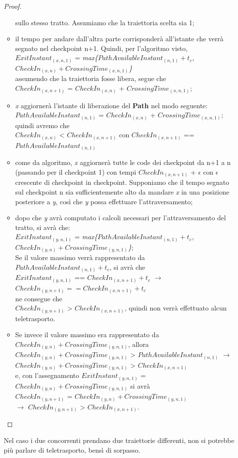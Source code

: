 \begin{itemize}
\begin{proof}
\begin{itemize}
sullo stesso tratto. Assumiamo che la traiettoria scelta sia 1;
\item il tempo per andare dall'altra parte corrisponderà all'istante che verrà segnato nel checkpoint 
n+1. Quindi, per l'algoritmo visto, \\
$ExitInstant_{(x,n,1)}$ = \emph{max\{$PathAvailableInstant_{(n,1)}+t_c$,$CheckIn_{(x,n)}+CrossingTime_{(x,n,1)}$\}}\\
assumendo che la traiettoria fosse libera, segue che\\
$CheckIn_{(x,n+1)}$ = $CheckIn_{(x,n)}$ + $CrossingTime_{(x,n,1)}$;
\item \emph{x} aggiornerà l'istante di liberazione del \textbf{Path} nel modo seguente:
$PathAvailableInstant_{(n,1)}$ = $CheckIn_{(x,n)}$ + $CrossingTime_{(x,n,1)}$;\\
quindi avremo che\\
$CheckIn_{(x,n)}$ < $CheckIn_{(x,n+1)}$ con $CheckIn_{(x,n+1)}$ == $PathAvailableInstant_{(n,1)}$
\item come da algoritmo, \emph{x} aggiornerà tutte le code dei checkpoint da n+1 a n (passando per il checkpoint 1) con tempi $CheckIn_{(x,n+1)}$ + $\epsilon$ 
con $\epsilon$ crescente di checkpoint in checkpoint. Supponiamo che il tempo segnato sul checkpoint n sia sufficientemente alto da mandare \emph{x}
in una posizione posteriore a \emph{y}, così che \emph{y} possa effettuare l'attraversamento;
\item dopo che \emph{y} avrà computato i calcoli necessari per l'attraversamento del tratto, si avrà che:\\
$ExitInstant_{(y,n,1)}$ = \emph{max\{$PathAvailableInstant_{(n,1)}+t_c$,$CheckIn_{(y,n)}+CrossingTime_{(y,n,1)}$\}};\\
Se il valore massimo verrà rappresentato da $PathAvailableInstant_{(n,1)}+t_c$, si avrà che \\
$ExitInstant_{(y,n,1)}$ == $CheckIn_{(x,n+1)}+t_c$ $\rightarrow$ $CheckIn_{(y,n+1)}==CheckIn_{(x,n+1)}+t_c$\\
ne consegue che\\
$CheckIn_{(y,n+1)}$ > $CheckIn_{(x,n+1)}$, quindi non verrà effettuato alcun teletrasporto.
\item Se invece il valore massimo era rappresentato da\\ 
$CheckIn_{(y,n)}+CrossingTime_{(y,n,1)}$, allora\\ 
$CheckIn_{(y,n)}+CrossingTime_{(y,n,1)}$ > $PathAvailableInstant_{(n,1)}$ $\rightarrow$\\ 
$CheckIn_{(y,n)}+CrossingTime_{(y,n,1)}$ > $CheckIn_{(x,n+1)}$ \\
e, con l'assegnamento
$ExitInstant_{(y,n,1)}$ = $CheckIn_{(y,n)}+CrossingTime_{(y,n,1)}$ si avrà \\
$CheckIn_{(y,n+1)}$ = $CheckIn_{(y,n)}+CrossingTime_{(y,n,1)}$\\
$\rightarrow$ $CheckIn_{(y,n+1)}$ > $CheckIn_{(x,n+1)}$.
\end{itemize}
\end{proof}
Nel caso i due concorrenti prendano due traiettorie differenti, non si potrebbe più parlare di teletrasporto, bensì di sorpasso.
\end{itemize}
